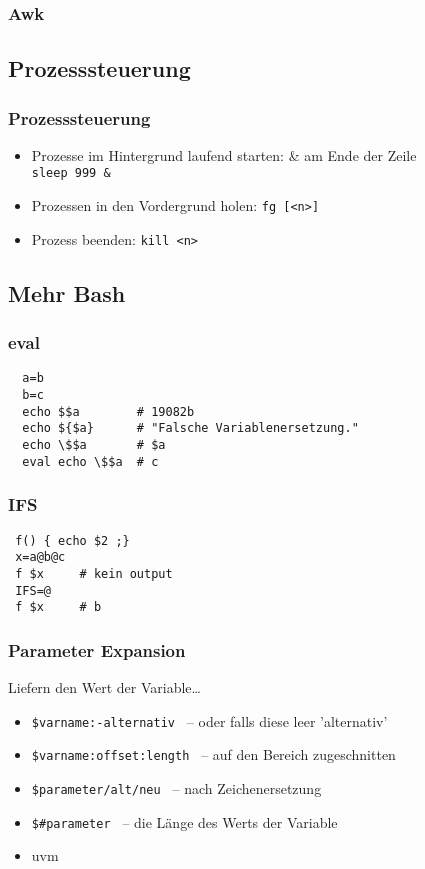 \documentclass{beamer}
\begin{document}
\begin{frame}
 \frametitle{Awk}
\end{frame}

\subsection{Prozesssteuerung}
\begin{frame}
 \frametitle{Prozesssteuerung}
 \begin{itemize}
  \item Prozesse im Hintergrund laufend starten: \& am Ende der Zeile \\
    {\tt sleep 999 \& }
  \item Prozessen in den Vordergrund holen: {\tt fg [<n>] }
  \item Prozess beenden: {\tt kill <n>}
 \end{itemize}
\end{frame}

\subsection{Mehr Bash}
\begin{frame}[fragile]
 \frametitle{eval}
 \begin{lstlisting}
  a=b
  b=c
  echo $$a        # 19082b
  echo ${$a}      # "Falsche Variablenersetzung."
  echo \$$a       # $a
  eval echo \$$a  # c 
 \end{lstlisting}
\end{frame}

\begin{frame}
 \frametitle{IFS}
 \begin{lstlisting}
 f() { echo $2 ;}
 x=a@b@c
 f $x     # kein output
 IFS=@
 f $x     # b
 \end{lstlisting}
\end{frame}

\begin{frame}
 \frametitle{Parameter Expansion}
 
 Liefern den Wert der Variable…
 \begin{itemize}
  \item {\tt \${varname:-alternativ} } -- oder falls diese leer 'alternativ'
  \item {\tt \${varname:offset:length} } -- auf den Bereich zugeschnitten
  \item {\tt \${parameter/alt/neu} } -- nach Zeichenersetzung
  \item {\tt \${\#parameter} } -- die Länge des Werts der Variable
  \item uvm
 \end{itemize}
\end{frame}
\end{document}
